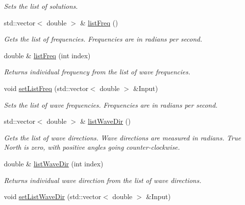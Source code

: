 \begin{DoxyCompactItemize}
\begin{DoxyCompactList}\small\item\em Sets the list of solutions. \end{DoxyCompactList}\item 
std\-::vector$<$ double $>$ \& \hyperlink{classosea_1_1ofreq_1_1_output_derived_aeca7e08a1c561ae61a7a97a59b05cbdf}{list\-Freq} ()
\begin{DoxyCompactList}\small\item\em Gets the list of frequencies. Frequencies are in radians per second. \end{DoxyCompactList}\item 
double \& \hyperlink{classosea_1_1ofreq_1_1_output_derived_ae630f20aca768c789851b82020e2a8c3}{list\-Freq} (int index)
\begin{DoxyCompactList}\small\item\em Returns individual frequency from the list of wave frequencies. \end{DoxyCompactList}\item 
void \hyperlink{classosea_1_1ofreq_1_1_output_derived_af2a183ee4e75c6de6af8cc2d27512ac4}{set\-List\-Freq} (std\-::vector$<$ double $>$ \&Input)
\begin{DoxyCompactList}\small\item\em Sets the list of wave frequencies. Frequencies are in radians per second. \end{DoxyCompactList}\item 
std\-::vector$<$ double $>$ \& \hyperlink{classosea_1_1ofreq_1_1_output_derived_a114e057d84f34e5138d077fd7f053898}{list\-Wave\-Dir} ()
\begin{DoxyCompactList}\small\item\em Gets the list of wave directions. Wave directions are measured in radians. True North is zero, with positive angles going counter-\/clockwise. \end{DoxyCompactList}\item 
double \& \hyperlink{classosea_1_1ofreq_1_1_output_derived_a043a3621ac94b69cd16170a550bb3905}{list\-Wave\-Dir} (int index)
\begin{DoxyCompactList}\small\item\em Returns individual wave direction from the list of wave directions. \end{DoxyCompactList}\item 
void \hyperlink{classosea_1_1ofreq_1_1_output_derived_ad482f0254c9886599e25495c88707efe}{set\-List\-Wave\-Dir} (std\-::vector$<$ double $>$ \&Input)

\end{DoxyCompactItemize}

